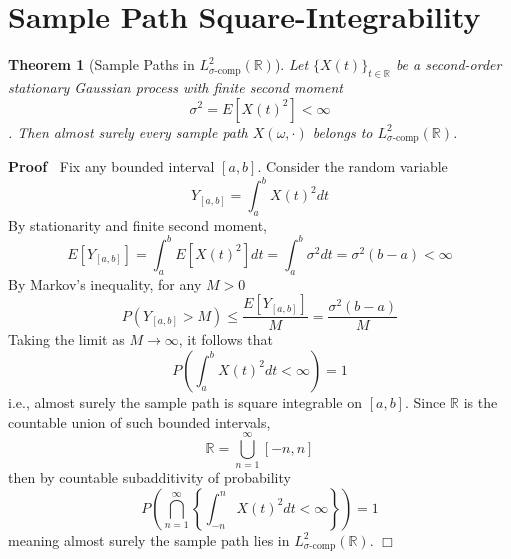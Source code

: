 \documentclass{article}
\newenvironment{proof}{\noindent\textbf{Proof\ }}{\hspace*{\fill}$\Box$\medskip}
\newtheorem{theorem}{Theorem}
\begin{document}
\section{Sample Path Square-Integrability}

\begin{theorem}
  [Sample Paths in $L^2_{\sigma \text{-comp}}
  (\mathbb{R})$]\label{thm:sample_paths_in_L2sigma} Let $\{X (t)\}_{t \in
  \mathbb{R}}$ be a second-order stationary Gaussian process with finite
  second moment
  \begin{equation}
    \sigma^2 = E [X (t)^2] < \infty
  \end{equation}
  . Then almost surely every sample path $X (\omega, \cdot)$ belongs to
  $L^2_{\sigma \text{-comp}} (\mathbb{R})$.
\end{theorem}

\begin{proof}
  Fix any bounded interval $[a, b]$. Consider the random variable
  \begin{equation}
    Y_{[a, b]} = \int_a^b X (t)^2 dt
  \end{equation}
  By stationarity and finite second moment,
  \begin{equation}
    E [Y_{[a, b]}] = \int_a^b E [X (t)^2] dt = \int_a^b \sigma^2 dt = \sigma^2
    (b - a) < \infty
  \end{equation}
  By Markov's inequality, for any $M > 0$
  \begin{equation}
    P (Y_{[a, b]} > M) \leq \frac{E [Y_{[a, b]}]}{M} = \frac{\sigma^2  (b -
    a)}{M}
  \end{equation}
  Taking the limit as $M \to \infty$, it follows that
  \begin{equation}
    P \left( \int_a^b X (t)^2 dt < \infty \right) = 1
  \end{equation}
  i.e., almost surely the sample path is square integrable on $[a, b]$. Since
  $\mathbb{R}$ is the countable union of such bounded intervals,
  \begin{equation}
    \mathbb{R}= \bigcup_{n = 1}^{\infty} [- n, n]
  \end{equation}
  then by countable subadditivity of probability
  \begin{equation}
    P \left( \bigcap_{n = 1}^{\infty} \left\{ \int_{- n}^n X (t)^2 dt < \infty
    \right\} \right) = 1
  \end{equation}
  meaning almost surely the sample path lies in $L^2_{\sigma \text{-comp}}
  (\mathbb{R})$.
\end{proof}
\end{document}
